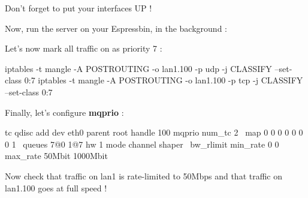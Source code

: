 Don't forget to put your interfaces UP !

Now, run the  server on your Espressbin, in the background :

Let's now mark all traffic on  as priority 7 :
\begin{targetbashinput}
iptables -t mangle -A POSTROUTING -o lan1.100 -p udp -j CLASSIFY --set-class 0:7
iptables -t mangle -A POSTROUTING -o lan1.100 -p tcp -j CLASSIFY --set-class 0:7
\end{targetbashinput}

Finally, let's configure \textbf{mqprio} :
\begin{targetbashinput}
tc qdisc add dev eth0 parent root handle 100 mqprio num_tc 2 \
map 0 0 0 0 0 0 0 1 \
queues 7@0 1@7 hw 1 mode channel shaper \
bw_rlimit min_rate 0 0 max_rate 50Mbit 1000Mbit
\end{targetbashinput}

Now check that traffic on lan1 is rate-limited to 50Mbps and that traffic on lan1.100 goes at full speed !

